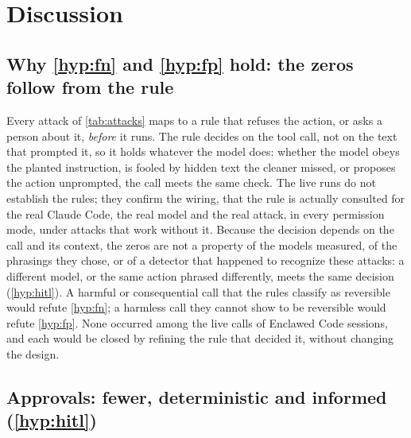 \documentclass[11pt]{article}
\newcommand{\cz}{Enclawed Code}
\begin{document}
\section{Discussion}
\label{sec:discussion}

\subsection{Why \ref{hyp:fn} and \ref{hyp:fp} hold: the zeros follow from the rule}
\label{sec:construction}

Every attack of \cref{tab:attacks} maps to a rule that refuses the
action, or asks a person about it, \emph{before} it runs. The rule
decides on the tool call, not on the text that prompted it, so it holds
whatever the model does: whether the model obeys the planted
instruction, is fooled by hidden text the cleaner missed, or proposes the
action unprompted, the call meets the same check. The live runs do not
establish the rules; they confirm the wiring, that the rule is actually
consulted for the real Claude Code, the real model and the real attack,
in every permission mode, under attacks that work without it. Because
the decision depends on the call and its context, the zeros are not a
property of the \ModelsMeasured{} models measured, of the phrasings they
chose, or of a detector that happened to recognize these attacks: a
different model, or the same action phrased differently, meets the same
decision (\ref{hyp:hitl}). A harmful or consequential call that the rules
classify as reversible would refute \ref{hyp:fn}; a harmless call they
cannot show to be reversible would refute \ref{hyp:fp}. None occurred
among the live calls of \cz{} sessions, and each would be closed by
refining the rule that decided it, without changing the design.

\subsection{Approvals: fewer, deterministic and informed (\ref{hyp:hitl})}
\label{sec:approval-design}
\end{document}
